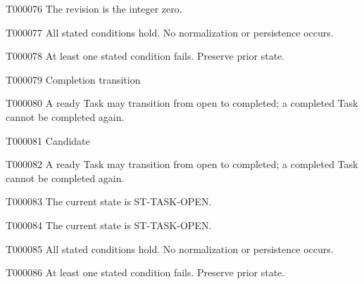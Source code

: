 \documentclass[11pt,a4paper]{article}
\begin{document}
\begin{atlasparagraph}{T000076}
The revision is the integer zero.
\end{atlasparagraph}
\begin{atlasparagraph}{T000077}
All stated conditions hold. No normalization or persistence occurs.
\end{atlasparagraph}
\begin{atlasparagraph}{T000078}
At least one stated condition fails. Preserve prior state.
\end{atlasparagraph}
\begin{atlastext}{T000079}
Completion transition
\end{atlastext}
\begin{atlasparagraph}{T000080}
A ready Task may transition from open to completed; a completed Task cannot be completed again.
\end{atlasparagraph}
\begin{atlastext}{T000081}
Candidate
\end{atlastext}
\begin{atlasparagraph}{T000082}
A ready Task may transition from open to completed; a completed Task cannot be completed again.
\end{atlasparagraph}
\begin{atlastext}{T000083}
The current state is ST-TASK-OPEN.
\end{atlastext}
\begin{atlasparagraph}{T000084}
The current state is ST-TASK-OPEN.
\end{atlasparagraph}
\begin{atlasparagraph}{T000085}
All stated conditions hold. No normalization or persistence occurs.
\end{atlasparagraph}
\begin{atlasparagraph}{T000086}
At least one stated condition fails. Preserve prior state.
\end{atlasparagraph}
\end{document}
